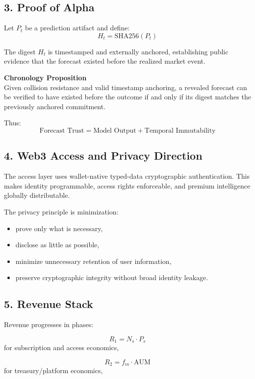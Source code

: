 \documentclass[11pt]{article}
\begin{document}
\subsection*{3. Proof of Alpha}

Let \(P_t\) be a prediction artifact and define:
\[
H_t = \mathrm{SHA256}(P_t)
\]

The digest \(H_t\) is timestamped and externally anchored, establishing public evidence that the forecast existed before the realized market event.

\begin{theorembox}
\textbf{Chronology Proposition}\\
Given collision resistance and valid timestamp anchoring, a revealed forecast can be verified to have existed before the outcome if and only if its digest matches the previously anchored commitment.
\end{theorembox}

Thus:
\[
\text{Forecast Trust} = \text{Model Output} + \text{Temporal Immutability}
\]

\subsection*{4. Web3 Access and Privacy Direction}

The access layer uses wallet-native typed-data cryptographic authentication. This makes identity programmable, access rights enforceable, and premium intelligence globally distributable.

The privacy principle is minimization:
\begin{itemize}[leftmargin=1.5em]
  \item prove only what is necessary,
  \item disclose as little as possible,
  \item minimize unnecessary retention of user information,
  \item preserve cryptographic integrity without broad identity leakage.
\end{itemize}

\subsection*{5. Revenue Stack}

Revenue progresses in phases:

\[
R_1 = N_s \cdot P_s
\]
for subscription and access economics,

\[
R_2 = f_m \cdot \text{AUM}
\]
for treasury/platform economics,
\end{document}
